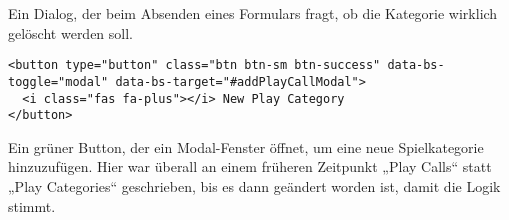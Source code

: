 Ein Dialog, der beim Absenden eines Formulars fragt, ob die Kategorie wirklich gelöscht werden soll.

\begin{verbatim}
<button type="button" class="btn btn-sm btn-success" data-bs-toggle="modal" data-bs-target="#addPlayCallModal">
  <i class="fas fa-plus"></i> New Play Category
</button>
\end{verbatim}

Ein grüner Button, der ein Modal-Fenster öffnet, um eine neue Spielkategorie hinzuzufügen. Hier war überall an einem früheren Zeitpunkt „Play Calls“ statt „Play Categories“ geschrieben, bis es dann geändert worden ist, damit die Logik stimmt.

